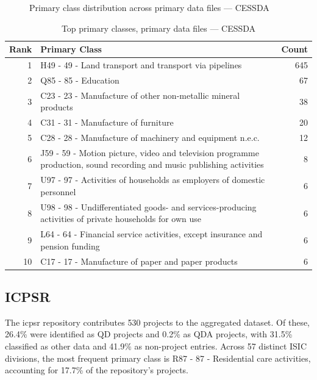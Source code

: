 \clearpage

\begin{figure}[H]
    \centering
    
    \caption{Primary class distribution across primary data files --- CESSDA}
\end{figure}

\begin{table}[H]
    \centering
    \begin{tabular}{r p{10cm} r}
    \hline
    \textbf{Rank} & \textbf{Primary Class} & \textbf{Count} \\
    \hline
    1 & H49 - 49 - Land transport and transport via pipelines & 645 \\
    2 & Q85 - 85 - Education & 67 \\
    3 & C23 - 23 - Manufacture of other non-metallic mineral products & 38 \\
    4 & C31 - 31 - Manufacture of furniture & 20 \\
    5 & C28 - 28 - Manufacture of machinery and equipment n.e.c. & 12 \\
    6 & J59 - 59 - Motion picture, video and television programme production, sound recording and music publishing activities & 8 \\
    7 & U97 - 97 - Activities of households as employers of domestic personnel & 6 \\
    8 & U98 - 98 - Undifferentiated goods- and services-producing activities of private households for own use & 6 \\
    9 & L64 - 64 - Financial service activities, except insurance and pension funding & 6 \\
    10 & C17 - 17 - Manufacture of paper and paper products & 6 \\
    \hline
    \end{tabular}
    \caption{Top primary classes, primary data files --- CESSDA}
\end{table}

\clearpage

\subsection{ICPSR}


The icpsr repository contributes 530 projects to the aggregated dataset. Of these, 26.4\% were identified as QD projects and 0.2\% as QDA projects, with 31.5\% classified as other data and 41.9\% as non-project entries. Across 57 distinct ISIC divisions, the most frequent primary class is R87 - 87 - Residential care activities, accounting for 17.7\% of the repository's projects.



